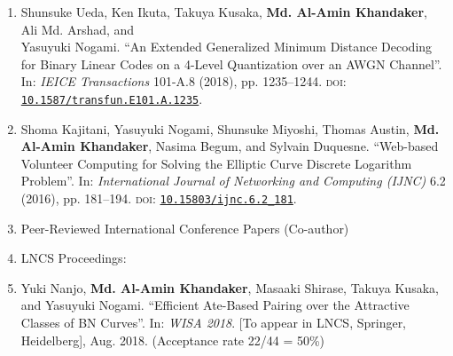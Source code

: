 \documentclass{article}[paper=a4,10pt]
\begin{document}
\begin{enumerate}
	\item Shunsuke Ueda, Ken Ikuta, Takuya Kusaka, \textbf{Md. Al-Amin Khandaker}, Ali Md. Arshad, and \\ Yasuyuki Nogami. ``An Extended Generalized Minimum Distance Decoding for Binary Linear Codes on a 4-Level Quantization over an AWGN Channel”. In: \textit{IEICE Transactions} 101-A.8 (2018), pp. 1235–1244. \textsc{doi}: \href{https://doi.org/10.1587/transfun.E101.A.1235}{\texttt{10.1587/transfun.E101.A.1235}}.
	
	\item Shoma Kajitani, Yasuyuki Nogami, Shunsuke Miyoshi, Thomas Austin, \textbf{Md. Al-Amin Khandaker}, Nasima Begum, and Sylvain Duquesne. “Web-based Volunteer Computing for Solving the Elliptic Curve Discrete Logarithm Problem”. In: \textit{International Journal of Networking and Computing (IJNC) }6.2 (2016), pp. 181–194. \textsc{doi}: \href{https://doi.org/10.15803/ijnc.6.2_181}{\texttt{10.15803/ijnc.6.2\_181}}.
	
	\vspace{10mm}
	\Large
	\item[] Peer-Reviewed International Conference Papers  (Co-author)
	\item[ ] \Large LNCS Proceedings:
	\normalsize
	\item Yuki Nanjo, \textbf{Md. Al-Amin Khandaker}, Masaaki Shirase, Takuya Kusaka, and Yasuyuki Nogami. ``Efficient Ate-Based Pairing over the Attractive Classes of BN Curves''. In: \textit{WISA 2018}. [To appear in LNCS, Springer, Heidelberg],  Aug. 2018.
	(Acceptance rate 22/44 = 50\%)
	

\end{enumerate}
\end{document}
